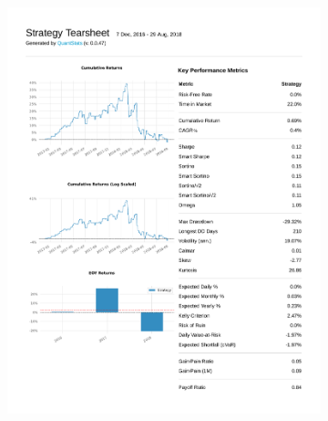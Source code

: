 \documentclass[12pt,a4paper]{article}
\begin{document}
\begin{figure}[ht!]
\begin{subfigure}[ht!]{0.45\textwidth}
    \includegraphics[page=2, width=\textwidth]{plots/qs_rppo.pdf}
  \end{subfigure}
  \begin{subfigure}[ht!]{0.45\textwidth}

\end{subfigure}
\end{figure}
\end{document}
